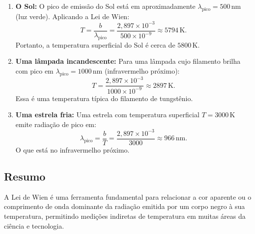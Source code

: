 \begin{enumerate}
    \item \textbf{O Sol:}  
    O pico de emissão do Sol está em aproximadamente \( \lambda_{\text{pico}} = 500\,\mathrm{nm} \) (luz verde). Aplicando a Lei de Wien:
    \[
    T = \frac{b}{\lambda_{\text{pico}}} = \frac{2,897 \times 10^{-3}}{500 \times 10^{-9}} \approx 5794\,\mathrm{K}.
    \]
    Portanto, a temperatura superficial do Sol é cerca de \( 5800\,\mathrm{K} \).

    \item \textbf{Uma lâmpada incandescente:}  
    Para uma lâmpada cujo filamento brilha com pico em \( \lambda_{\text{pico}} = 1000\,\mathrm{nm} \) (infravermelho próximo):
    \[
    T = \frac{2,897 \times 10^{-3}}{1000 \times 10^{-9}} \approx 2897\,\mathrm{K}.
    \]
    Essa é uma temperatura típica do filamento de tungstênio.

    \item \textbf{Uma estrela fria:}  
    Uma estrela com temperatura superficial \( T = 3000\,\mathrm{K} \) emite radiação de pico em:
    \[
    \lambda_{\text{pico}} = \frac{b}{T} = \frac{2,897 \times 10^{-3}}{3000} \approx 966\,\mathrm{nm}.
    \]
    O que está no infravermelho próximo.
\end{enumerate}

\subsection*{Resumo}

A Lei de Wien é uma ferramenta fundamental para relacionar a cor aparente ou o comprimento de onda dominante da radiação emitida por 
um corpo negro à sua temperatura, permitindo medições indiretas de temperatura em muitas áreas da ciência e tecnologia.

